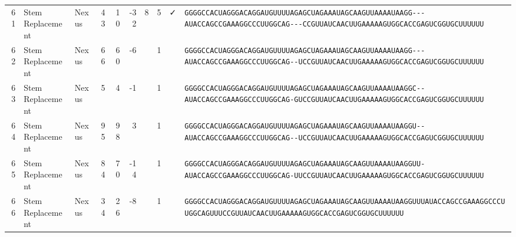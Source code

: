 \begin{tabular}{rllrrrrrcl}
 61 & Stem Replacement & Nexus & 43 & 10 & -32 & 8 & 5 & ✓ &
 \color{ucsfdarkgrey}\verb|GGGGCCACUAGGGACAGGAU|\color{ucsforange}\verb|GUUUUA|\color{ucsfblue}\verb|GAGCUAGAAAUAGCAAGU|\color{ucsforange}\verb|UAAAAUAA|\color{ucsfnavy}\verb|GG---|\color{ucsfpurple}\verb|AUACCAGCCGAAAGGCCCUUGGCAG|\color{ucsfnavy}\verb|---CC|\color{ucsforange}\verb|GUUAUCA|\color{ucsfteal}\verb|ACUUGAAAAAGU|\color{ucsforange}\verb|GGCACCGAGUCGGUGCUUUUUU| \\

 62 & Stem Replacement & Nexus & 66 & 60 & -6 &  & 1 &  &
 \color{ucsfdarkgrey}\verb|GGGGCCACUAGGGACAGGAU|\color{ucsforange}\verb|GUUUUA|\color{ucsfblue}\verb|GAGCUAGAAAUAGCAAGU|\color{ucsforange}\verb|UAAAAUAA|\color{ucsfnavy}\verb|GG---|\color{ucsfpurple}\verb|AUACCAGCCGAAAGGCCCUUGGCAG|\color{ucsfnavy}\verb|--UCC|\color{ucsforange}\verb|GUUAUCA|\color{ucsfteal}\verb|ACUUGAAAAAGU|\color{ucsforange}\verb|GGCACCGAGUCGGUGCUUUUUU| \\

 63 & Stem Replacement & Nexus & 5 & 4 & -1 &  & 1 &  &
 \color{ucsfdarkgrey}\verb|GGGGCCACUAGGGACAGGAU|\color{ucsforange}\verb|GUUUUA|\color{ucsfblue}\verb|GAGCUAGAAAUAGCAAGU|\color{ucsforange}\verb|UAAAAUAA|\color{ucsfnavy}\verb|GGC--|\color{ucsfpurple}\verb|AUACCAGCCGAAAGGCCCUUGGCAG|\color{ucsfnavy}\verb|-GUCC|\color{ucsforange}\verb|GUUAUCA|\color{ucsfteal}\verb|ACUUGAAAAAGU|\color{ucsforange}\verb|GGCACCGAGUCGGUGCUUUUUU| \\

 64 & Stem Replacement & Nexus & 95 & 98 & 3 &  & 1 &  &
 \color{ucsfdarkgrey}\verb|GGGGCCACUAGGGACAGGAU|\color{ucsforange}\verb|GUUUUA|\color{ucsfblue}\verb|GAGCUAGAAAUAGCAAGU|\color{ucsforange}\verb|UAAAAUAA|\color{ucsfnavy}\verb|GGU--|\color{ucsfpurple}\verb|AUACCAGCCGAAAGGCCCUUGGCAG|\color{ucsfnavy}\verb|--UCC|\color{ucsforange}\verb|GUUAUCA|\color{ucsfteal}\verb|ACUUGAAAAAGU|\color{ucsforange}\verb|GGCACCGAGUCGGUGCUUUUUU| \\

 65 & Stem Replacement & Nexus & 84 & 70 & -14 &  & 1 &  &
 \color{ucsfdarkgrey}\verb|GGGGCCACUAGGGACAGGAU|\color{ucsforange}\verb|GUUUUA|\color{ucsfblue}\verb|GAGCUAGAAAUAGCAAGU|\color{ucsforange}\verb|UAAAAUAA|\color{ucsfnavy}\verb|GGUU-|\color{ucsfpurple}\verb|AUACCAGCCGAAAGGCCCUUGGCAG|\color{ucsfnavy}\verb|-UUCC|\color{ucsforange}\verb|GUUAUCA|\color{ucsfteal}\verb|ACUUGAAAAAGU|\color{ucsforange}\verb|GGCACCGAGUCGGUGCUUUUUU| \\

 66 & Stem Replacement & Nexus & 34 & 26 & -8 &  & 1 &  &
 \color{ucsfdarkgrey}\verb|GGGGCCACUAGGGACAGGAU|\color{ucsforange}\verb|GUUUUA|\color{ucsfblue}\verb|GAGCUAGAAAUAGCAAGU|\color{ucsforange}\verb|UAAAAUAA|\color{ucsfnavy}\verb|GGUUU|\color{ucsfpurple}\verb|AUACCAGCCGAAAGGCCCUUGGCAG|\color{ucsfnavy}\verb|UUUCC|\color{ucsforange}\verb|GUUAUCA|\color{ucsfteal}\verb|ACUUGAAAAAGU|\color{ucsforange}\verb|GGCACCGAGUCGGUGCUUUUUU| \\


\end{tabular}
